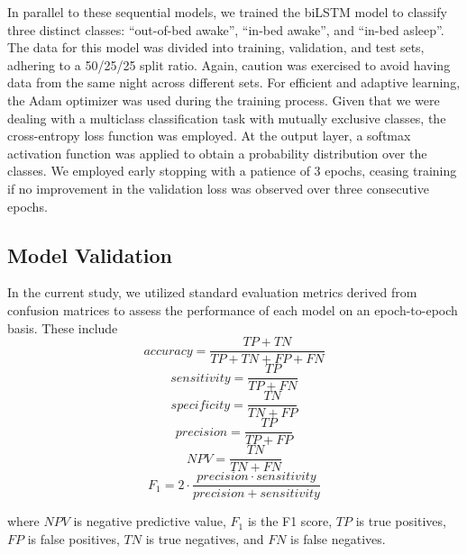 \documentclass[
  10pt,
]{scrbook}
\begin{document}
In parallel to these sequential models, we trained the biLSTM model to
classify three distinct classes: ``out-of-bed awake'', ``in-bed awake'',
and ``in-bed asleep''. The data for this model was divided into
training, validation, and test sets, adhering to a 50/25/25 split ratio.
Again, caution was exercised to avoid having data from the same night
across different sets. For efficient and adaptive learning, the Adam
optimizer was used during the training process. Given that we were
dealing with a multiclass classification task with mutually exclusive
classes, the cross-entropy loss function was employed. At the output
layer, a softmax activation function was applied to obtain a probability
distribution over the classes. We employed early stopping with a
patience of 3 epochs, ceasing training if no improvement in the
validation loss was observed over three consecutive epochs.

\hypertarget{model-validation}{%
\subsection{Model Validation}\label{model-validation}}

In the current study, we utilized standard evaluation metrics derived
from confusion matrices to assess the performance of each model on an
epoch-to-epoch basis. These include
\[accuracy = \frac{TP+TN}{TP+TN+FP+FN}\]
\[sensitivity = \frac{TP}{TP+FN}\] \[specificity = \frac{TN}{TN+FP}\]
\[precision = \frac{TP}{TP+FP}\] \[NPV = \frac{TN}{TN + FN}\]
\[F_1 = 2 \cdot \frac{precision \cdot sensitivity}{precision + sensitivity}\]

where \(NPV\) is negative predictive value, \(F_1\) is the F1 score,
\(TP\) is true positives, \(FP\) is false positives, \(TN\) is true
negatives, and \(FN\) is false negatives.
\end{document}
